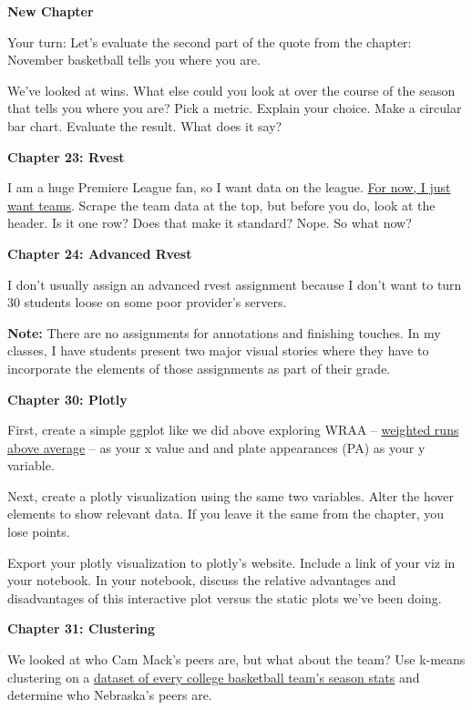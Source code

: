 \documentclass[
]{book}
\begin{document}
\textbf{New Chapter}

Your turn: Let's evaluate the second part of the quote from the chapter: November basketball tells you where you are.

We've looked at wins. What else could you look at over the course of the season that tells you where you are? Pick a metric. Explain your choice. Make a circular bar chart. Evaluate the result. What does it say?

\textbf{Chapter 23: Rvest}

I am a huge Premiere League fan, so I want data on the league. \href{https://fbref.com/en/comps/9/stats/Premier-League-Stats}{For now, I just want teams}. Scrape the team data at the top, but before you do, look at the header. Is it one row? Does that make it standard? Nope. So what now?

\textbf{Chapter 24: Advanced Rvest}

I don't usually assign an advanced rvest assignment because I don't want to turn 30 students loose on some poor provider's servers.

\textbf{Note:} There are no assignments for annotations and finishing touches. In my classes, I have students present two major visual stories where they have to incorporate the elements of those assignments as part of their grade.

\textbf{Chapter 30: Plotly}

First, create a simple ggplot like we did above exploring WRAA -- \href{http://m.mlb.com/glossary/advanced-stats/weighted-runs-above-average}{weighted runs above average} -- as your x value and and plate appearances (PA) as your y variable.

Next, create a plotly visualization using the same two variables. Alter the hover elements to show relevant data. If you leave it the same from the chapter, you lose points.

Export your plotly visualization to plotly's website. Include a link of your viz in your notebook. In your notebook, discuss the relative advantages and disadvantages of this interactive plot versus the static plots we've been doing.

\textbf{Chapter 31: Clustering}

We looked at who Cam Mack's peers are, but what about the team? Use k-means clustering on a \href{https://unl.box.com/s/qdqu5rbz7f9jtk04fhuiqrb9p0nx5a0z}{dataset of every college basketball team's season stats} and determine who Nebraska's peers are.
\end{document}
